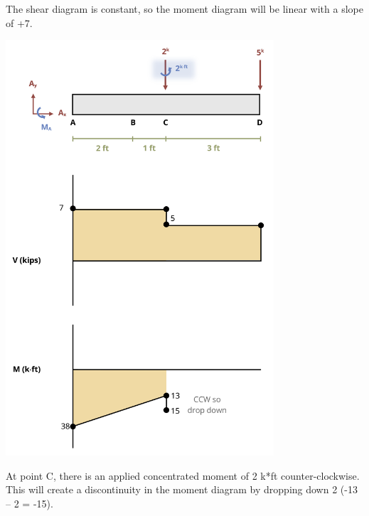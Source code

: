\documentclass[
  letterpaper,
  DIV=11,
  numbers=noendperiod]{scrreprt}
\begin{document}
\begin{tcolorbox}
The shear diagram is constant, so the moment diagram will be linear with
a slope of +7.

\begin{center}
\includegraphics[width=3.92708in,height=\textheight]{images/CH7 PNGs/example 7.4 part 5.png}
\end{center}

At point C, there is an applied concentrated moment of 2 k*ft
counter-clockwise. This will create a discontinuity in the moment
diagram by dropping down 2 (-13 -- 2 = -15).


\end{tcolorbox}
\end{document}
